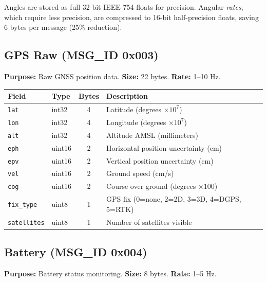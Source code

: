 \documentclass[11pt,a4paper]{article}
\begin{document}
\begin{notebox}
Angles are stored as full 32-bit IEEE 754 floats for precision. Angular \emph{rates}, which require less precision, are compressed to 16-bit half-precision floats, saving 6 bytes per message (25\% reduction).
\end{notebox}

\subsection{GPS Raw (MSG\_ID 0x003)}

\textbf{Purpose:} Raw GNSS position data. \textbf{Size:} 22 bytes. \textbf{Rate:} 1--10 Hz.

\begin{table}[H]
\centering
\begin{tabular}{@{}llcl@{}}
\toprule
\textbf{Field} & \textbf{Type} & \textbf{Bytes} & \textbf{Description} \\
\midrule
\texttt{lat}        & int32  & 4 & Latitude (degrees $\times 10^7$) \\
\texttt{lon}        & int32  & 4 & Longitude (degrees $\times 10^7$) \\
\texttt{alt}        & int32  & 4 & Altitude AMSL (millimeters) \\
\texttt{eph}        & uint16 & 2 & Horizontal position uncertainty (cm) \\
\texttt{epv}        & uint16 & 2 & Vertical position uncertainty (cm) \\
\texttt{vel}        & uint16 & 2 & Ground speed (cm/s) \\
\texttt{cog}        & uint16 & 2 & Course over ground (degrees $\times 100$) \\
\texttt{fix\_type}  & uint8  & 1 & GPS fix (0=none, 2=2D, 3=3D, 4=DGPS, 5=RTK) \\
\texttt{satellites} & uint8  & 1 & Number of satellites visible \\
\bottomrule
\end{tabular}
\end{table}

\subsection{Battery (MSG\_ID 0x004)}

\textbf{Purpose:} Battery status monitoring. \textbf{Size:} 8 bytes. \textbf{Rate:} 1--5 Hz.
\end{document}
